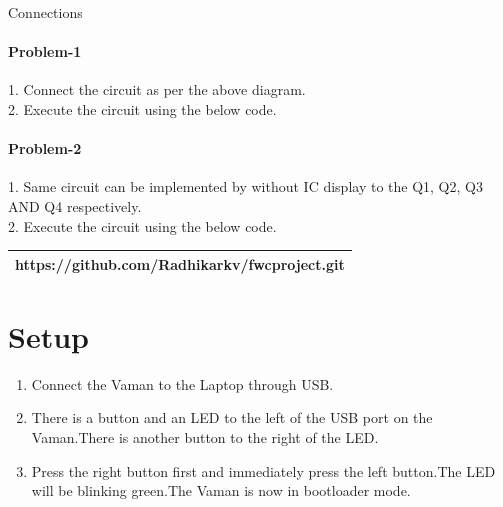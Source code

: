 \documentclass[10pt, a4paper]{article}
\begin{document}
\begin{center}
    Connections
\end{center}
        
    \paragraph{Problem-1}
    1. Connect the circuit as per the above diagram.\\
    2. Execute the circuit using the below code.\\
	\paragraph{Problem-2}
1. Same circuit can be implemented by without IC display to the Q1, Q2, Q3 AND Q4 respectively.\\
2. Execute the circuit using the below code.\\

\begin{tabularx}{0.46\textwidth} { 
  | >{\centering\arraybackslash}X |}
  \hline
 https://github.com/Radhikarkv/fwcproject.git\\
  \hline
\end{tabularx}


\section{Setup}
\begin{enumerate}
\item Connect the Vaman to the Laptop through USB.
\item There is a button and an LED to the left of the USB port on the Vaman.There is another button to the right of the LED.
\item Press the right button first and immediately press the left button.The LED will be blinking green.The Vaman is now in bootloader mode.
\end{enumerate}
\end{document}
